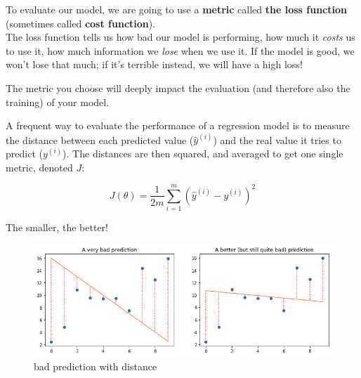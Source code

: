 To evaluate our model, we are going to use a \textbf{metric} called \textbf{the loss function} (sometimes called \textbf{cost function}).\\
\newline
The loss function tells us how bad our model is performing, how much it \textit{costs} us to use it, how much information we \textit{lose} when we use it.
If the model is good, we won't lose that much; if it's terrible instead, we will have a high loss!

The metric you choose will deeply impact the evaluation (and therefore also the training) of your model.

A frequent way to evaluate the performance of a regression model is to measure the distance between each predicted value ($\hat{y}^{(i)}$) and the real value it tries to predict (${y}^{(i)}$). The distances are then squared, and averaged to get one single metric, denoted $J$:

$$
J(\theta) = \frac{1}{2m}\sum_{i=1}^{m}(\hat{y}^{(i)} - y^{(i)})^2
$$

The smaller, the better! 

\begin{figure}[h!]
  \centering
  \includegraphics[scale=0.55]{assets/bad_pred_with_distance.png}
  \caption{bad prediction with distance}
\end{figure}
